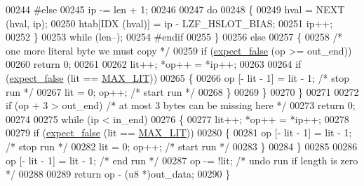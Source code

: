 \begin{DoxyCode}
00244 \textcolor{preprocessor}{#}\textcolor{preprocessor}{else}
00245           ip -= len + 1;
00246 
00247           \textcolor{keywordflow}{do}
00248             \{
00249               hval = NEXT (hval, ip);
00250               htab[IDX (hval)] = ip - LZF\_HSLOT\_BIAS;
00251               ip++;
00252             \}
00253           \textcolor{keywordflow}{while} (len--);
00254 \textcolor{preprocessor}{#}\textcolor{preprocessor}{endif}
00255         \}
00256       \textcolor{keywordflow}{else}
00257         \{
00258           \textcolor{comment}{/* one more literal byte we must copy */}
00259           \textcolor{keywordflow}{if} (\hyperlink{lzf__c_8c_afc5fc140e1c36b6f0d3fc1699b038792}{expect\_false} (op >= out\_end))
00260             \textcolor{keywordflow}{return} 0;
00261 
00262           lit++; *op++ = *ip++;
00263 
00264           \textcolor{keywordflow}{if} (\hyperlink{lzf__c_8c_afc5fc140e1c36b6f0d3fc1699b038792}{expect\_false} (lit == \hyperlink{lzf__c_8c_a8ff610436e92b6fdcefdc820c25760b2}{MAX\_LIT}))
00265             \{
00266               op [- lit - 1] = lit - 1; \textcolor{comment}{/* stop run */}
00267               lit = 0; op++; \textcolor{comment}{/* start run */}
00268             \}
00269         \}
00270     \}
00271 
00272   \textcolor{keywordflow}{if} (op + 3 > out\_end) \textcolor{comment}{/* at most 3 bytes can be missing here */}
00273     \textcolor{keywordflow}{return} 0;
00274 
00275   \textcolor{keywordflow}{while} (ip < in\_end)
00276     \{
00277       lit++; *op++ = *ip++;
00278 
00279       \textcolor{keywordflow}{if} (\hyperlink{lzf__c_8c_afc5fc140e1c36b6f0d3fc1699b038792}{expect\_false} (lit == \hyperlink{lzf__c_8c_a8ff610436e92b6fdcefdc820c25760b2}{MAX\_LIT}))
00280         \{
00281           op [- lit - 1] = lit - 1; \textcolor{comment}{/* stop run */}
00282           lit = 0; op++; \textcolor{comment}{/* start run */}
00283         \}
00284     \}
00285 
00286   op [- lit - 1] = lit - 1; \textcolor{comment}{/* end run */}
00287   op -= !lit; \textcolor{comment}{/* undo run if length is zero */}
00288 
00289   \textcolor{keywordflow}{return} op - (u8 *)out\_data;
00290 \}
\end{DoxyCode}
